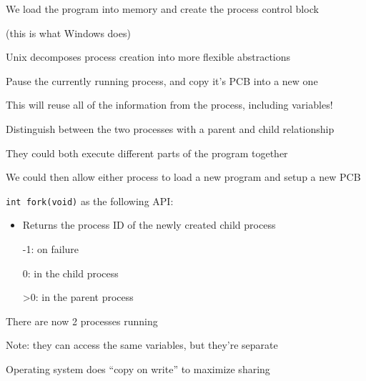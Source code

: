   \begin{slide}

    We load the program into memory and create the process control block

    \leftspace{}(this is what Windows does)
    \bigskip

    Unix decomposes process creation into more flexible abstractions
  \end{slide}

  \begin{slide}
    

    Pause the currently running process, and copy it's PCB into a new one

    \leftspace{}This will reuse all of the information from the process,
    including variables!
    \medskip


    Distinguish between the two processes with a parent and child relationship

    \leftspace{}They could both execute different parts of the program together
    \bigskip

    We could then allow either process to load a new program and setup a new PCB

  \end{slide}

  \begin{slide}


    \texttt{int fork(void)} as the following API:
    \begin{itemize}
      \item Returns the process ID of the newly created child process

            \leftspace{}-1: on failure

            \leftspace{}0: in the child process

            \leftspace{}>0: in the parent process
    \end{itemize}
    \medskip

    There are now 2 processes running

    \leftspace{}Note: they can access the same variables, but they're separate

    \leftspace{}\leftspace{}Operating system does ``copy on write'' to maximize sharing
  \end{slide}

